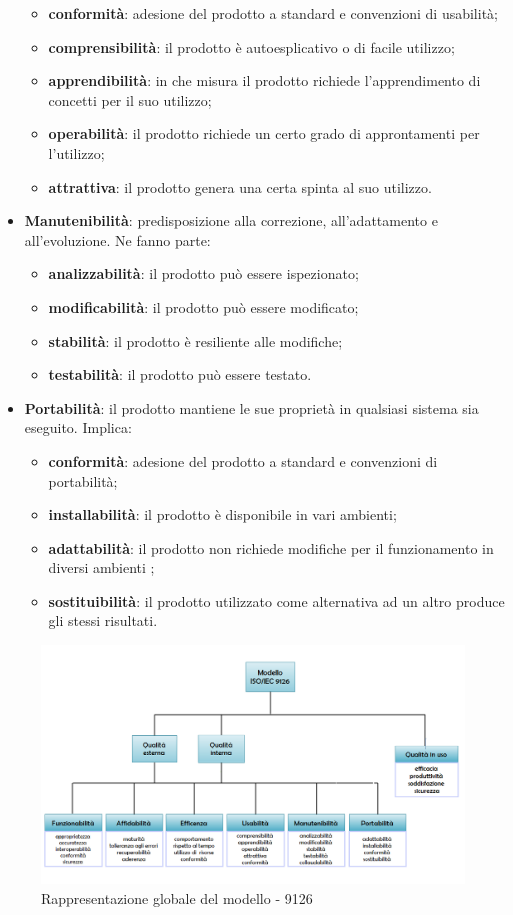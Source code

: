\begin{itemize}
	\begin{itemize}
		\item \textbf{conformità}: adesione del prodotto a standard e convenzioni di usabilità;
		\item \textbf{comprensibilità}: il prodotto è autoesplicativo o di facile utilizzo;
		\item \textbf{apprendibilità}: in che misura il prodotto richiede l'apprendimento di concetti per il suo utilizzo;
		\item \textbf{operabilità}: il prodotto richiede un certo grado di approntamenti per l'utilizzo;
		\item \textbf{attrattiva}: il prodotto genera una certa spinta al suo utilizzo.
	\end{itemize}	
	\item \textbf{Manutenibilità}: predisposizione alla correzione, all'adattamento e all'evoluzione. Ne fanno parte: 
	\begin{itemize}
		\item \textbf{analizzabilità}: il prodotto può essere ispezionato;
		\item \textbf{modificabilità}: il prodotto può essere modificato;
		\item \textbf{stabilità}: il prodotto è resiliente alle modifiche;
		\item \textbf{testabilità}: il prodotto può essere testato.
	\end{itemize}
	\item \textbf{Portabilità}: il prodotto mantiene le sue proprietà in qualsiasi sistema sia eseguito. Implica:
	\begin{itemize}
		\item \textbf{conformità}: adesione del prodotto a standard e convenzioni di portabilità;
	\item \textbf{installabilità}: il prodotto è disponibile in vari ambienti;
	\item \textbf{adattabilità}: il prodotto non richiede modifiche per il funzionamento in diversi ambienti ;
	\item \textbf{sostituibilità}: il prodotto utilizzato come alternativa ad un altro produce gli stessi risultati.
	\end{itemize}
\end{itemize}
\begin{figure}[H]
	\centering
	\includegraphics[width=15cm]{iso9126}
	\caption{Rappresentazione globale del modello - 9126}
\end{figure}